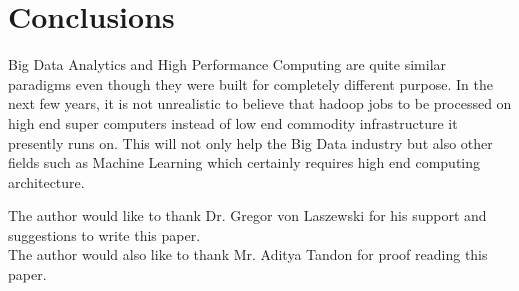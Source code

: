 \documentclass[sigconf]{acmart}
\begin{document}
\section{Conclusions}

Big Data Analytics and High Performance Computing are quite similar paradigms even though they were built for completely different purpose. In the next few years, it is not unrealistic to believe that hadoop jobs to be processed on high end super computers instead of low end commodity infrastructure it presently runs on. This will not only help the Big Data industry but also other fields such as Machine Learning which certainly requires high end computing architecture. 


\appendix

\begin{acks}

 The author would like to thank Dr. Gregor von Laszewski for his support and suggestions to write this paper.
 \\
 The author would also like to thank Mr. Aditya Tandon for proof reading this paper.
\\
\end{acks}


 


\end{document}
